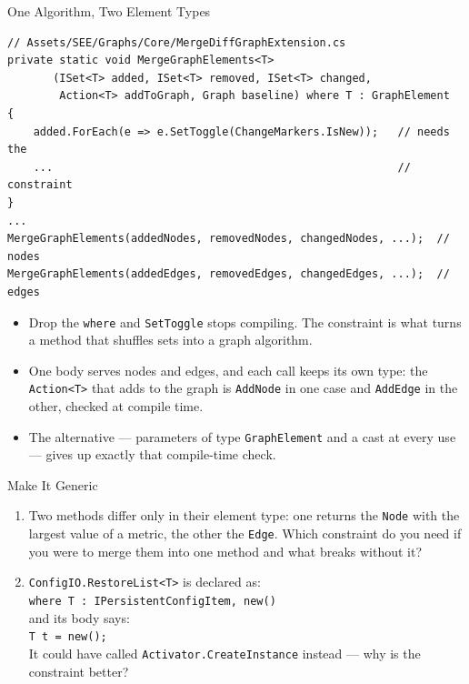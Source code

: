\begin{frame}[fragile]{One Algorithm, Two Element Types}
  \begin{lstlisting}[basicstyle=\scriptsize\ttfamily]
// Assets/SEE/Graphs/Core/MergeDiffGraphExtension.cs
private static void MergeGraphElements<T>
       (ISet<T> added, ISet<T> removed, ISet<T> changed,
        Action<T> addToGraph, Graph baseline) where T : GraphElement
{
    added.ForEach(e => e.SetToggle(ChangeMarkers.IsNew));   // needs the
    ...                                                     // constraint
}
...
MergeGraphElements(addedNodes, removedNodes, changedNodes, ...);  // nodes
MergeGraphElements(addedEdges, removedEdges, changedEdges, ...);  // edges
  \end{lstlisting}
  \vspace{1ex}

  \begin{itemize}
    \item Drop the \texttt{where} and \texttt{SetToggle} stops compiling. The
      constraint is what turns a method that shuffles sets into a graph
      algorithm.
    \item One body serves nodes and edges, and each call keeps its own type:
      the \texttt{Action<T>} that adds to the graph is
      \texttt{AddNode} in one case and \texttt{AddEdge} in the other, checked
      at compile time.
    \item The alternative --- parameters of type \texttt{GraphElement} and a
      cast at every use --- gives up exactly that compile-time check.
  \end{itemize}
\end{frame}

\begin{exerciseframe}{Make It Generic}
  \begin{enumerate}
    \item Two methods differ only in their element type: one returns the
      \texttt{Node} with the largest value of a metric, the other the
      \texttt{Edge}. Which constraint do you need if you were to merge them
      into one method and what breaks without it?
    \item \texttt{ConfigIO.RestoreList<T>} is declared as:\\
      \hspace{3ex}\texttt{where T : IPersistentConfigItem, new()}\\
      and its body says:\\
      \hspace{3ex}\texttt{T t = new();}\\
      It could have called \texttt{Activator.CreateInstance} instead --- why is
      the constraint better?
  \end{enumerate}
\end{exerciseframe}

